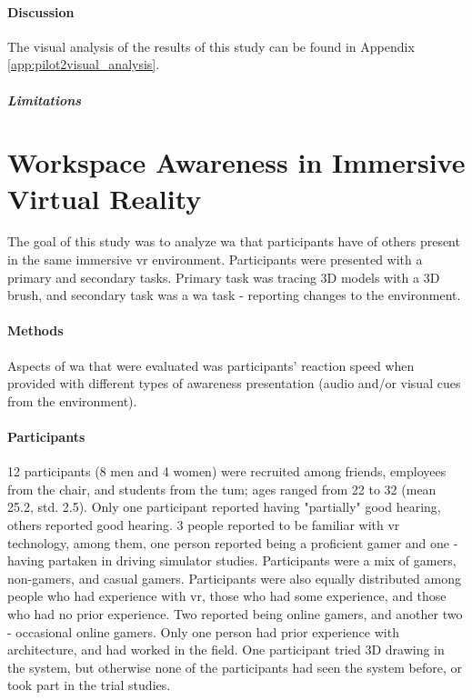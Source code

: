 \paragraph{Discussion}
The visual analysis of the results of this study can be found in Appendix \ref{app:pilot2visual_analysis}.

\subparagraph{Limitations}
















\section{Workspace Awareness in Immersive Virtual Reality}
\label{final_study}
The goal of this study was to analyze \gls{wa} that participants have of others present in the same immersive \gls{vr} environment. Participants were presented with a primary and secondary tasks. Primary task was tracing 3D models with a 3D brush, and secondary task was a \gls{wa} task - reporting changes to the environment.

\paragraph{Methods}
Aspects of \gls{wa} that were evaluated was participants’ reaction speed when provided with different types of awareness presentation (audio and/or visual cues from the environment).

\paragraph{Participants}
12 participants (8 men and 4 women) were recruited among friends, employees from the chair, and students from the \gls{tum}; ages ranged from 22 to 32 (mean 25.2, std. 2.5). Only one participant reported having "partially" good hearing, others reported good hearing. 3 people reported to be familiar with \gls{vr} technology, among them, one person reported being a proficient gamer and one - having partaken in driving simulator studies. Participants were a mix of gamers, non-gamers, and casual gamers. Participants were also equally distributed among people who had experience with \gls{vr}, those who had some experience, and those who had no prior experience. Two reported being online gamers, and another two - occasional online gamers. Only one person had prior experience with architecture, and had worked in the field. One participant tried 3D drawing in the system, but otherwise none of the participants had seen the system before, or took part in the trial studies.

